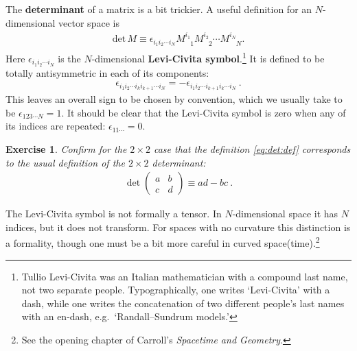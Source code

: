 \documentclass[
  11pt,
	colorful,
	raggedright,
]{tufte-style-thesis-flip}
\newtheorem{exercise}{Exercise}[section]
\newcommand{\aij}[2]{^{#1}_{\phantom{#1}#2}}
\begin{document}
The \textbf{determinant} of a matrix is a bit trickier. A useful definition for an $N$-dimensional vector space is
\begin{align}
  \text{det}\,M \equiv 
  \epsilon_{i_1i_2\cdots i_N} 
    M\aij{i_1}{1} M\aij{i_2}{2}\cdots M\aij{i_N}{N} . 
    \label{eq:det:def}
\end{align}
Here $\epsilon_{i_1i_2\cdots i_N}$ is the $N$-dimensional \textbf{Levi-Civita symbol}.\footnote{Tullio Levi-Civita was an Italian mathematician with a compound last name, not two separate people. Typographically, one writes `Levi-Civita' with a dash, while one writes the concatenation of two different people's last names with an en-dash, e.g.\ `Randall--Sundrum models.'}
%
It is defined to be totally antisymmetric in each of its components:
\begin{align}
  \epsilon_{i_1i_2\cdots i_{k}i_{k+1}\cdots i_N} 
  =
  -
  \epsilon_{i_1i_2\cdots i_{k+1}i_{k}\cdots i_N}  \ .
\end{align}
This leaves an overall sign to be chosen by convention, which we usually take to be $\epsilon_{123\cdots N} = 1$. It should be clear that the Levi-Civita symbol is zero when any of its indices are repeated: $\epsilon_{11\cdots} = 0$. 
\begin{exercise}
Confirm for the $2\times 2$ case that the definition \eqref{eq:det:def} corresponds to the usual definition of the $2\times 2$ determinant:
\begin{align}
  \det
  \begin{pmatrix}
    a & b \\ c& d
  \end{pmatrix}
  \equiv ad - bc \ .
\end{align}
\end{exercise}
The Levi-Civita symbol is not formally a tensor. In $N$-dimensional space it has $N$ indices, but it does not transform. For spaces with no curvature this distinction is a formality, though one must be a bit more careful in curved space(time).\footnote{See the opening chapter of Carroll's \emph{Spacetime and Geometry}.}
\end{document}
